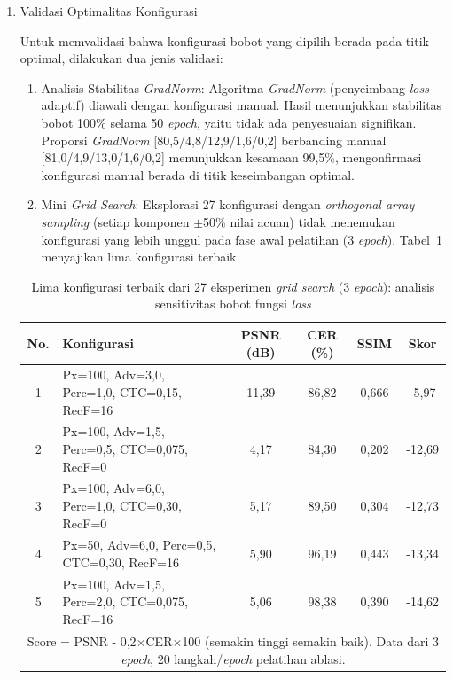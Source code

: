 \documentclass[12pt,a4paper]{article}
\begin{document}
\begin{enumerate}[leftmargin=1.5em, labelsep=0.5em, itemindent=0pt, label=\arabic*., topsep=0pt, partopsep=0pt]
    \item Validasi Optimalitas Konfigurasi
    
    Untuk memvalidasi bahwa konfigurasi bobot yang dipilih berada pada titik optimal, dilakukan dua jenis validasi:

    \begin{enumerate}[leftmargin=1.5em, labelsep=0.5em, itemindent=0pt, noitemsep, topsep=0pt, label=\alph*)]
        \item Analisis Stabilitas \textit{GradNorm}: Algoritma \textit{GradNorm} (penyeimbang \textit{loss} adaptif) diawali dengan konfigurasi manual. Hasil menunjukkan stabilitas bobot 100\% selama 50 \textit{epoch}, yaitu tidak ada penyesuaian signifikan. Proporsi \textit{GradNorm} [80,5/4,8/12,9/1,6/0,2] berbanding manual [81,0/4,9/13,0/1,6/0,2] menunjukkan kesamaan 99,5\%, mengonfirmasi konfigurasi manual berada di titik keseimbangan optimal.
        
        \item Mini \textit{Grid Search}: Eksplorasi 27 konfigurasi dengan \textit{orthogonal array sampling} (setiap komponen $\pm$50\% nilai acuan) tidak menemukan konfigurasi yang lebih unggul pada fase awal pelatihan (3 \textit{epoch}). Tabel~\ref{tab:grid-search-top5} menyajikan lima konfigurasi terbaik.
    \end{enumerate}

    \begin{table}[!htbp]
        \caption[Lima konfigurasi terbaik \textit{grid search}]{Lima konfigurasi terbaik dari 27 eksperimen \textit{grid search} (3 \textit{epoch}): analisis sensitivitas bobot fungsi \textit{loss}}
        \label{tab:grid-search-top5}
        \small
        \begin{tabular}{|c|p{4.5cm}|c|c|c|c|}
            \hline
            \textbf{No.} & \textbf{Konfigurasi} & \textbf{PSNR (dB)} & \textbf{CER (\%)} & \textbf{SSIM} & \textbf{Skor} \\
            \hline
            1 & Px=100, Adv=3,0, Perc=1,0, CTC=0,15, RecF=16 & 11,39 & 86,82 & 0,666 & -5,97 \\
            2 & Px=100, Adv=1,5, Perc=0,5, CTC=0,075, RecF=0 & 4,17 & 84,30 & 0,202 & -12,69 \\
            3 & Px=100, Adv=6,0, Perc=1,0, CTC=0,30, RecF=0 & 5,17 & 89,50 & 0,304 & -12,73 \\
            4 & Px=50, Adv=6,0, Perc=0,5, CTC=0,30, RecF=16 & 5,90 & 96,19 & 0,443 & -13,34 \\
            5 & Px=100, Adv=1,5, Perc=2,0, CTC=0,075, RecF=16 & 5,06 & 98,38 & 0,390 & -14,62 \\
            \hline
            \multicolumn{6}{|p{13cm}|}{\footnotesize Score = PSNR - 0,2$\times$CER$\times$100 (semakin tinggi semakin baik). Data dari 3 \textit{epoch}, 20 langkah/\textit{epoch} pelatihan ablasi.} \\
            \hline
        \end{tabular}
    \end{table}


\end{enumerate}
\end{document}
